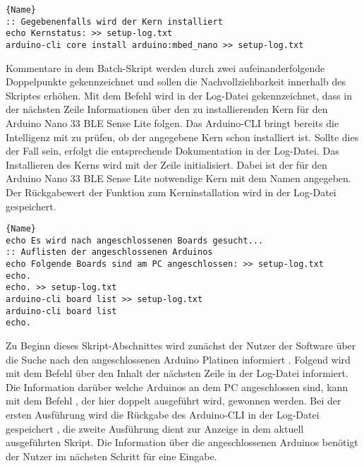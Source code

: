 \begin{lstlisting}{Name}
:: Gegebenenfalls wird der Kern installiert
echo Kernstatus: >> setup-log.txt
arduino-cli core install arduino:mbed_nano >> setup-log.txt
\end{lstlisting}

Kommentare in dem Batch-Skript werden durch zwei aufeinanderfolgende Doppelpunkte gekennzeichnet  und sollen die Nachvollziehbarkeit innerhalb des Skriptes erhöhen. Mit dem Befehl  wird in der Log-Datei gekennzeichnet, dass in der nächsten Zeile Informationen über den zu installierenden Kern für den Arduino Nano 33 BLE Sense Lite folgen. Das Arduino-CLI bringt bereits die Intelligenz mit zu prüfen, ob der angegebene Kern schon installiert ist. Sollte dies der Fall sein, erfolgt die entsprechende Dokumentation in der Log-Datei. Das Installieren des Kerns wird mit der Zeile  initialisiert. Dabei ist der für den Arduino Nano 33 BLE Sense Lite notwendige Kern mit dem Namen  angegeben. Der Rückgabewert der Funktion zum Kerninstallation wird in der Log-Datei gespeichert.

\begin{lstlisting}{Name}
echo Es wird nach angeschlossenen Boards gesucht...
:: Auflisten der angeschlossenen Arduinos
echo Folgende Boards sind am PC angeschlossen: >> setup-log.txt
echo.
echo. >> setup-log.txt
arduino-cli board list >> setup-log.txt
arduino-cli board list
echo.
\end{lstlisting}

Zu Beginn dieses Skript-Abschnittes wird zunächst der Nutzer der Software über die Suche nach den angeschlossenen Arduino Platinen informiert . Folgend wird mit dem Befehl  über den Inhalt der nächsten Zeile in der Log-Datei informiert. Die Information darüber welche Arduinos an dem PC angeschlossen sind, kann mit dem Befehl , der hier doppelt ausgeführt wird, gewonnen werden. Bei der ersten Ausführung wird die Rückgabe des Arduino-CLI in der Log-Datei gespeichert , die zweite Ausführung dient zur Anzeige in dem aktuell ausgeführten Skript. Die Information über die angeschlossenen Arduinos benötigt der Nutzer im nächsten Schritt für eine Eingabe.

